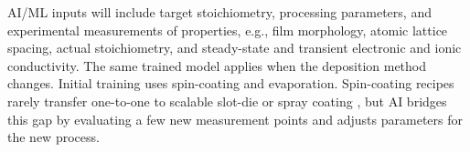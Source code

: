 \documentclass[pgs]{DOE}
\newcommand{\mnote}[1]{{\marginpar{\color{red} #1}}}
\newcommand{\todo}[2]{{[\color{RawSienna} #1] \color{red} #2}}
\newcommand{\draft}[1]{{\color{TealBlue} #1}}
\renewcommand{\mnote}[1]{}
\renewcommand{\todo}[2]{}
\begin{document}
 AI/ML inputs will include target stoichiometry, processing parameters, and experimental measurements of properties, e.g., film morphology, atomic lattice spacing, actual stoichiometry, and steady-state and transient electronic and ionic conductivity. The same trained model applies when the deposition method changes. Initial training uses spin-coating and evaporation. Spin-coating recipes rarely transfer one-to-one to scalable slot-die or spray coating \cite{Hamukwaya2022feb,Jafarzadeh2026apr}, but AI bridges this gap by evaluating a few new measurement points and adjusts parameters for the new process.

% 


% 

% 
\end{document}
